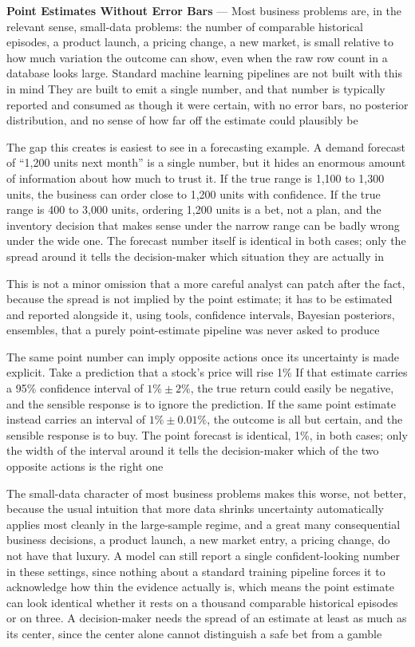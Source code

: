 \textbf{Point Estimates Without Error Bars} --- Most business problems are, in
the relevant sense, small-data problems: the number of comparable historical
episodes, a product launch, a pricing change, a new market, is small relative to
how much variation the outcome can show, even when the raw row count in a database
looks large. Standard machine learning pipelines are not built with this in mind
They are built to emit a single number, and that number is typically reported
and consumed as though it were certain, with no error bars, no posterior
distribution, and no sense of how far off the estimate could plausibly be

The gap this creates is easiest to see in a forecasting example. A demand forecast
of ``1,200 units next month'' is a single number, but it hides an enormous
amount of information about how much to trust it. If the true range is 1,100 to 1,300
units, the business can order close to 1,200 units with confidence. If the true range
is 400 to 3,000 units, ordering 1,200 units is a bet, not a plan, and the
inventory decision that makes sense under the narrow range can be badly wrong
under the wide one. The forecast number itself is identical in both cases; only
the spread around it tells the decision-maker which situation they are actually
in

This is not a minor omission that a more careful analyst can patch after the fact,
because the spread is not implied by the point estimate; it has to be estimated and
reported alongside it, using tools, confidence intervals, Bayesian posteriors, ensembles,
that a purely point-estimate pipeline was never asked to produce

The same point number can imply opposite actions once its uncertainty is made
explicit. Take a prediction that a stock's price will rise 1\% If that estimate
carries a 95\% confidence interval of $1\% \pm 2\%$, the true return could easily be
negative, and the sensible response is to ignore the prediction. If the same point
estimate instead carries an interval of $1\% \pm 0.01\%$, the outcome is all but
certain, and the sensible response is to buy. The point forecast is identical,
1\%, in both cases; only the width of the interval around it tells the
decision-maker which of the two opposite actions is the right one

The small-data character of most business problems makes this worse, not better,
because the usual intuition that more data shrinks uncertainty automatically applies
most cleanly in the large-sample regime, and a great many consequential business
decisions, a product launch, a new market entry, a pricing change, do not have
that luxury. A model can still report a single confident-looking number in these
settings, since nothing about a standard training pipeline forces it to
acknowledge how thin the evidence actually is, which means the point estimate can
look identical whether it rests on a thousand comparable historical episodes or on
three. A decision-maker needs the spread of an estimate at least as much as its
center, since the center alone cannot distinguish a safe bet from a gamble

